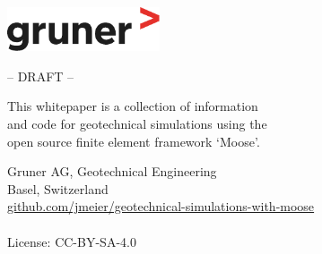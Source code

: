 \begin{titlepage}
    \begin{flushright}
        \includegraphics[width=4.5cm]{img/gruner.pdf}
    \end{flushright}
    \begin{center}
        \vspace*{5cm}

        {\Huge\textbf{\varTitle}}

        \vspace{5cm}

        \large{-- DRAFT --}

        \vfill

        \large{This whitepaper is a collection of information\\
            and code for geotechnical simulations using the\\
            open source finite element framework ‘Moose’.}

        \vfill

        \textbf{\varAuthor}

        \vspace{0.8cm}

        Gruner AG, Geotechnical Engineering\\
        Basel, Switzerland\\

        \vspace{1cm}
        \href{https://github.com/jmeier/geotechnical-simulations-with-moose}{github.com/jmeier/geotechnical-simulations-with-moose}\\
        \varDate\\

        \vspace{1cm}
        License: CC-BY-SA-4.0

    \end{center}
\end{titlepage}